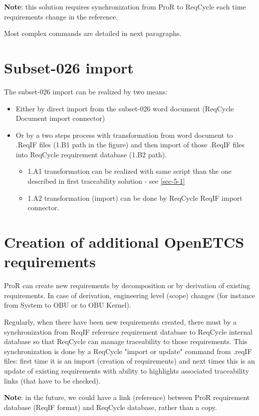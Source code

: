 \documentclass[11pt]{template/openetcs_report}
\begin{document}
\textbf{Note}: this solution requires synchronization from ProR to ReqCycle each time requirements change in the reference.
 
Most complex commands are detailed in next paragraphs.

\section{Subset-026 import}
\label{sec-6-1}
The subset-026 import can be realized by two means:
\begin{itemize}
\item Either by direct import from the subset-026 word document (ReqCycle Document import connector)
\item Or by a two steps process with transformation from word document to .ReqIF files (1.B1 path in the figure) and then import of those .ReqIF files into ReqCycle requirement database (1.B2 path).
	\begin{itemize}

	\item 1.A1 transformation can be realized with same script than the one described in first traceability solution - see \ref{sec-5-1}

	\item 1.A2 transformation (import) can be done by ReqCycle ReqIF import connector.
	\end{itemize}
\end{itemize}

\section{Creation of additional OpenETCS requirements}
\label{sec-6-2}
ProR can create new requirements by decomposition or by derivation of existing requirements.
In case of derivation, engineering level (scope) changes (for instance from System to OBU or to OBU Kernel).

Regularly, when there have been new requirements created, there must by a synchronization from ReqIF reference requirement database to ReqCycle internal database so that ReqCycle can manage traceability to those requirements. This synchronization is done by a ReqCycle "import or update" command from .reqIF files: first time it is an import (creation of requirements) and next times this is an update of existing requirements with ability to highlights associated traceability links (that have to be checked).

\textbf{Note}: in the future, we could have a link (reference) between ProR requirement database (ReqIF format) and ReqCycle database, rather than a copy. 
\end{document}

